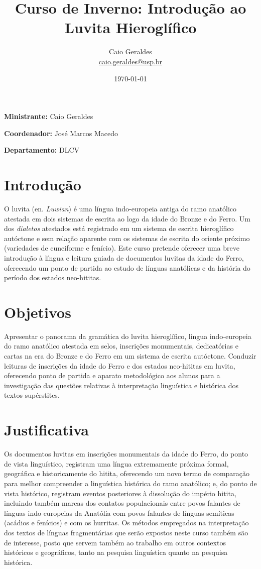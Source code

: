 \documentclass[article,12pt]{memoir}
\title{Curso de Inverno: Introdução ao Luvita Hieroglífico}
\author{Caio Geraldes\\\url{caio.geraldes@usp.br}}
\date{\today}
\begin{document}
\maketitle

\noindent\textbf{Ministrante:} Caio Geraldes

\noindent\textbf{Coordenador:} José Marcos Macedo

\noindent\textbf{Departamento:} DLCV

\hypertarget{introduuxe7uxe3o}{%
	\chapter{Introdução}\label{introduuxe7uxe3o}}

O luvita (en. \emph{Luwian}) é uma língua indo-europeia antiga do ramo
anatólico atestada em dois sistemas de escrita ao logo da idade do
Bronze e do Ferro. Um dos \emph{dialetos} atestados está registrado em
um sistema de escrita hieroglífico autóctone e sem relação aparente com
os sistemas de escrita do oriente próximo (variedades de cuneiforme e
fenício). Este curso pretende oferecer uma breve introdução à língua e
leitura guiada de documentos luvitas da idade do Ferro, oferecendo um
ponto de partida ao estudo de línguas anatólicas e da história do
período dos estados neo-hititas.

\hypertarget{objetivos}{%
	\chapter{Objetivos}\label{objetivos}}

Apresentar o panorama da gramática do luvita hieroglífico, lingua
indo-europeia do ramo anatólico atestada em selos, inscrições
monumentais, dedicatórias e cartas na era do Bronze e do Ferro em um
sistema de escrita autóctone. Conduzir leituras de inscrições da idade
do Ferro e dos estados neo-hititas em luvita, oferecendo ponto de
partida e aparato metodológico aos alunos para a investigação das
questões relativas à interpretação linguística e histórica dos textos
supérstites.

\hypertarget{justificativa}{%
	\chapter{Justificativa}\label{justificativa}}

Os documentos luvitas em inscrições monumentais da idade do Ferro, do
ponto de vista linguístico, registram uma língua extremamente próxima
formal, geográfica e historicamente do hitita, oferecendo um novo termo
de comparação para melhor compreender a linguística histórica do ramo
anatólico; e, do ponto de vista histórico, registram eventos posteriores
à dissolução do império hitita, incluindo também marcas dos contatos
populacionais entre povos falantes de línguas indo-europeias da Anatólia
com povos falantes de línguas semíticas (acádios e fenícios) e com os
hurritas. Os métodos empregados na interpretação dos textos de línguas
fragmentárias que serão expostos neste curso também são de interesse,
posto que servem também ao trabalho em outros contextos históricos e
geográficos, tanto na pesquisa linguística quanto na pesquisa histórica.
\end{document}
